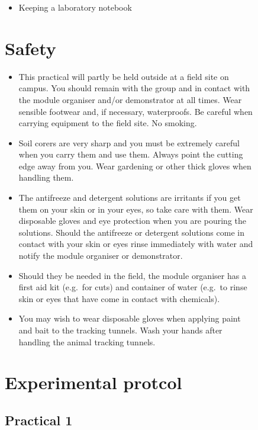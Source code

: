 \documentclass[
  letterpaper,
  DIV=11,
  numbers=noendperiod]{scrreprt}
\providecommand{\tightlist}{%
  \setlength{\itemsep}{0pt}\setlength{\parskip}{0pt}}
\begin{document}
\begin{figure}
{\begin{itemize}
\tightlist
\item
  Keeping a laboratory notebook
\end{itemize}

\section{Safety}\label{safety-1}

\begin{itemize}
\tightlist
\item
  This practical will partly be held outside at a field site on campus.
  You should remain with the group and in contact with the module
  organiser and/or demonstrator at all times. Wear sensible footwear
  and, if necessary, waterproofs. Be careful when carrying equipment to
  the field site. No smoking.
\item
  Soil corers are very sharp and you must be extremely careful when you
  carry them and use them. Always point the cutting edge away from you.
  Wear gardening or other thick gloves when handling them.
\item
  The antifreeze and detergent solutions are irritants if you get them
  on your skin or in your eyes, so take care with them. Wear disposable
  gloves and eye protection when you are pouring the solutions. Should
  the antifreeze or detergent solutions come in contact with your skin
  or eyes rinse immediately with water and notify the module organiser
  or demonstrator.
\item
  Should they be needed in the field, the module organiser has a first
  aid kit (e.g.~for cuts) and container of water (e.g.~to rinse skin or
  eyes that have come in contact with chemicals).
\item
  You may wish to wear disposable gloves when applying paint and bait to
  the tracking tunnels. Wash your hands after handling the animal
  tracking tunnels.
\end{itemize}

\section{Experimental protcol}\label{experimental-protcol}

\subsection{Practical 1}\label{practical-1}

}
\end{figure}
\end{document}
